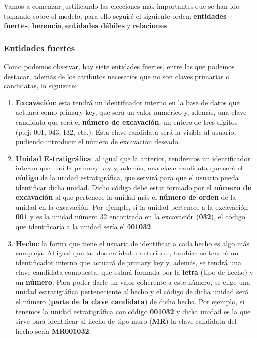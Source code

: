     Vamos a comenzar justificando las elecciones más importantes que se han ido tomando
    sobre el modelo, para ello seguiré el siguiente orden: \textbf{entidades fuertes},
    \textbf{herencia}, \textbf{entidades débiles} y \textbf{relaciones}.\\

    \subsubsection{Entidades fuertes}
    Como podemos observar, hay siete entidades fuertes, entre las que podemos destacar,
    además de los atributos necesarios que no son claves primarias o candidatas, lo siguiente:

    \begin{enumerate}
        \item \textbf{Excavación}: esta tendrá un identificador interno en la base de
        datos que actuará como primary key, que será un valor numérico y, además, una clave
        candidata que será el \textbf{número de excavación}, un entero de tres dígitos
        (p.ej: 001, 043, 132, etc.). Esta clave candidata será la visible al usuario, pudiendo
        introducir el número de excavación deseado.

        \item \textbf{Unidad Estratigráfica}: al igual que la anterior, tendremos un
        identificador interno que será la primary key y, además, una clave candidata que
        será el \textbf{código} de la unidad estratigráfica, que servirá para que el usuario
        pueda identificar dicha unidad. Dicho código debe estar formado por el
        \textbf{número de excavación} al que pertenece la unidad más el \textbf{número de orden}
        de la unidad en la excavación. Por ejemplo, si la unidad pertenece a la excavación
        \textbf{001} y es la unidad número 32 encontrada en la excavación (\textbf{032}), el
        código que identificaría a la unidad sería el \textbf{001032}.

        \item \textbf{Hecho}: la forma que tiene el usuario de identificar a cada hecho es algo
        más compleja. Al igual que las dos entidades anteriores, también se tendrá un
        identificador interno que actuará de primary key y, además, se tendrá una clave
        candidata compuesta, que estará formada por la \textbf{letra} (tipo de hecho) y un
        \textbf{número}. Para poder darle un valor coherente a este número, se elige una
        unidad estratigráfica perteneciente al hecho y el código de dicha unidad será el
        número (\textbf{parte de la clave candidata}) de dicho hecho. Por ejemplo, si tenemos
        la unidad estratigráfica con código \textbf{001032} y dicha unidad es la que sirve
        para identificar al hecho de tipo muro (\textbf{MR}) la clave candidata del hecho
        sería \textbf{MR001032}.


\end{enumerate}
